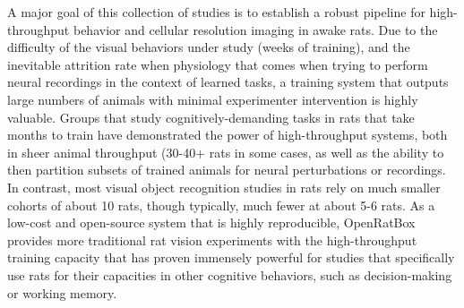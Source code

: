 A major goal of this collection of studies is to establish a robust pipeline for high-throughput behavior and cellular resolution imaging in awake rats. Due to the difficulty of the visual behaviors under study (weeks of training), and the inevitable attrition rate when physiology that comes when trying to perform neural recordings in the context of learned tasks, a training system that outputs large numbers of animals with minimal experimenter intervention is highly valuable. Groups that study cognitively-demanding tasks in rats that take months to train have demonstrated the power of high-throughput systems, both in sheer animal throughput (30-40+ rats in some cases\cite{Brunton2013, Constantinople2019}, as well as the ability to then partition subsets of trained animals for neural perturbations or recordings\cite{Ehrlich2011, Hanks2015, Constantinople2019}. In contrast, most visual object recognition studies in rats rely on much smaller cohorts of about 10 rats, though typically, much fewer at about 5-6 rats\cite{Zoccolan2009, Tafazoli2012, Vermaercke2012, Alemi-Neissi2013, Vinken2017}. As a low-cost and open-source system that is highly reproducible, OpenRatBox provides more traditional rat vision experiments with the high-throughput training capacity that has proven immensely powerful for studies that specifically use rats for their capacities in other cognitive behaviors, such as decision-making or working memory.







